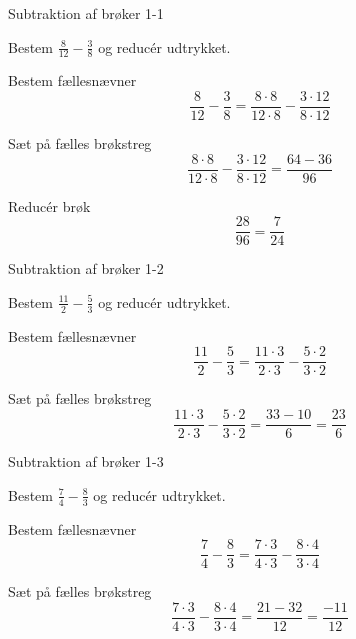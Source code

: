 \documentclass{article}
\begin{document}
	\tableofcontents
	\newpage
	
	\begin{exercise}{Subtraktion af brøker 1-1}
		
		Bestem $\frac{8}{12}-\frac{3}{8}$ og reducér udtrykket.
		
		
		\hint
		
		Bestem fællesnævner
		\[
		\frac{8}{12}-\frac{3}{8}  = \frac{8 \cdot 8}{12 \cdot 8}-\frac{3 \cdot 12}{8\cdot 12} 
		\]
		
		\hint
		
		Sæt på fælles brøkstreg
		\[
		\frac{8 \cdot 8}{12 \cdot 8}-\frac{3 \cdot 12}{8\cdot 12}    = \frac{64-36}{96} 
		\]
		
		\hint
		
		Reducér brøk
		\[
		\frac{28}{96} = \frac{7}{24}
		\]
		
	\end{exercise}
	
	\newpage
	
	\begin{exercise}{Subtraktion af brøker 1-2}
		
		Bestem $\frac{11}{2}-\frac{5}{3}$ og reducér udtrykket.
		
		
		\hint
		
		Bestem fællesnævner
		\[
		\frac{11}{2}-\frac{5}{3}  = \frac{11 \cdot 3}{2 \cdot 3}-\frac{5 \cdot 2}{3\cdot 2} 
		\]
		
		\hint
		
		Sæt på fælles brøkstreg
		\[
		\frac{11 \cdot 3}{2 \cdot 3}-\frac{5 \cdot 2}{3\cdot 2}    = \frac{33-10}{6}  = \frac{23}{6}
		\]
		
		
	\end{exercise}
	\newpage
	
	\begin{exercise}{Subtraktion af brøker 1-3}
		
		Bestem $\frac{7}{4}-\frac{8}{3}$ og reducér udtrykket.
		
		
		\hint
		
		Bestem fællesnævner
		\[
		\frac{7}{4}-\frac{8}{3}  = \frac{7 \cdot 3}{4 \cdot 3}-\frac{8 \cdot 4}{3\cdot 4} 
		\]
		
		\hint
		
		Sæt på fælles brøkstreg
		\[
		\frac{7 \cdot 3}{4 \cdot 3}-\frac{8 \cdot 4}{3\cdot 4}    = \frac{21-32}{12}  = \frac{-11}{12}
		\]
		
		
	\end{exercise}
	
\end{document}
